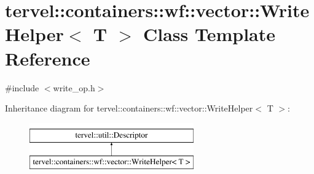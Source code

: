 \hypertarget{classtervel_1_1containers_1_1wf_1_1vector_1_1_write_helper}{}\section{tervel\+:\+:containers\+:\+:wf\+:\+:vector\+:\+:Write\+Helper$<$ T $>$ Class Template Reference}
\label{classtervel_1_1containers_1_1wf_1_1vector_1_1_write_helper}


{\ttfamily \#include $<$write\+\_\+op.\+h$>$}

Inheritance diagram for tervel\+:\+:containers\+:\+:wf\+:\+:vector\+:\+:Write\+Helper$<$ T $>$\+:\begin{figure}[H]
\begin{center}
\leavevmode
\includegraphics[height=2.000000cm]{classtervel_1_1containers_1_1wf_1_1vector_1_1_write_helper}
\end{center}
\end{figure}
